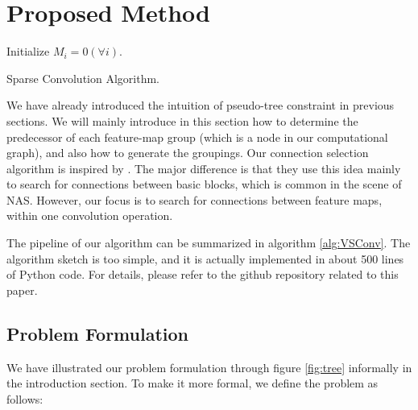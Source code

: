 \documentclass{acmtog} %
\begin{document}
\section{Proposed Method}
\begin{algorithm}
\SetAlgoLined
{}
Initialize $M_i = 0 (\forall{i})$.\\

\caption{Sparse Convolution Algorithm.}
\label{alg:VSConv}
\end{algorithm}

We have already introduced the intuition of pseudo-tree constraint in previous sections. We will mainly introduce in this section how to determine the predecessor of each feature-map group (which is a node in our computational graph), and also how to generate the groupings. Our connection selection algorithm is inspired by \cite{GNAS}. The major difference is that they use this idea mainly to search for connections between basic blocks, which is common in the scene of NAS. However, our focus is to search for connections between feature maps, within one convolution operation.

The pipeline of our algorithm can be summarized in algorithm \ref{alg:VSConv}. The algorithm sketch is too simple, and it is actually implemented in about 500 lines of Python code. For details, please refer to the github repository related to this paper.

\subsection{Problem Formulation}
We have illustrated our problem formulation through figure \ref{fig:tree} informally in the introduction section. To make it more formal, we define the problem as follows:
\end{document}
